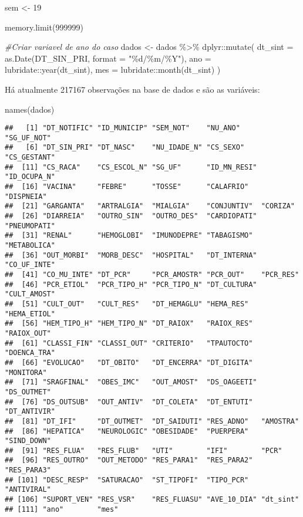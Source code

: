 \documentclass[
]{article}
\newenvironment{Shaded}{\begin{snugshade}}{\end{snugshade}}
\newcommand{\AttributeTok}[1]{\textcolor[rgb]{0.77,0.63,0.00}{#1}}
\newcommand{\CommentTok}[1]{\textcolor[rgb]{0.56,0.35,0.01}{\textit{#1}}}
\newcommand{\DecValTok}[1]{\textcolor[rgb]{0.00,0.00,0.81}{#1}}
\newcommand{\FunctionTok}[1]{\textcolor[rgb]{0.00,0.00,0.00}{#1}}
\newcommand{\NormalTok}[1]{#1}
\newcommand{\OtherTok}[1]{\textcolor[rgb]{0.56,0.35,0.01}{#1}}
\newcommand{\SpecialCharTok}[1]{\textcolor[rgb]{0.00,0.00,0.00}{#1}}
\newcommand{\StringTok}[1]{\textcolor[rgb]{0.31,0.60,0.02}{#1}}
\begin{document}
\begin{Shaded}
\begin{Highlighting}[]
\NormalTok{sem }\OtherTok{\textless{}{-}} \DecValTok{19}

\FunctionTok{memory.limit}\NormalTok{(}\DecValTok{999999}\NormalTok{)}

\CommentTok{\#Criar variavel de ano do caso}
\NormalTok{dados }\OtherTok{\textless{}{-}}\NormalTok{  dados }\SpecialCharTok{\%\textgreater{}\%}
\NormalTok{  dplyr}\SpecialCharTok{::}\FunctionTok{mutate}\NormalTok{(}
    \AttributeTok{dt\_sint =} \FunctionTok{as.Date}\NormalTok{(DT\_SIN\_PRI, }\AttributeTok{format =} \StringTok{"\%d/\%m/\%Y"}\NormalTok{),}
    \AttributeTok{ano =}\NormalTok{ lubridate}\SpecialCharTok{::}\FunctionTok{year}\NormalTok{(dt\_sint),}
    \AttributeTok{mes =}\NormalTok{ lubridate}\SpecialCharTok{::}\FunctionTok{month}\NormalTok{(dt\_sint)}
\NormalTok{  )}
\end{Highlighting}
\end{Shaded}

Há atualmente 217167 observações na base de dados e são as variáveis:

\begin{Shaded}
\begin{Highlighting}[]
\FunctionTok{names}\NormalTok{(dados)}
\end{Highlighting}
\end{Shaded}

\begin{verbatim}
##   [1] "DT_NOTIFIC" "ID_MUNICIP" "SEM_NOT"    "NU_ANO"     "SG_UF_NOT" 
##   [6] "DT_SIN_PRI" "DT_NASC"    "NU_IDADE_N" "CS_SEXO"    "CS_GESTANT"
##  [11] "CS_RACA"    "CS_ESCOL_N" "SG_UF"      "ID_MN_RESI" "ID_OCUPA_N"
##  [16] "VACINA"     "FEBRE"      "TOSSE"      "CALAFRIO"   "DISPNEIA"  
##  [21] "GARGANTA"   "ARTRALGIA"  "MIALGIA"    "CONJUNTIV"  "CORIZA"    
##  [26] "DIARREIA"   "OUTRO_SIN"  "OUTRO_DES"  "CARDIOPATI" "PNEUMOPATI"
##  [31] "RENAL"      "HEMOGLOBI"  "IMUNODEPRE" "TABAGISMO"  "METABOLICA"
##  [36] "OUT_MORBI"  "MORB_DESC"  "HOSPITAL"   "DT_INTERNA" "CO_UF_INTE"
##  [41] "CO_MU_INTE" "DT_PCR"     "PCR_AMOSTR" "PCR_OUT"    "PCR_RES"   
##  [46] "PCR_ETIOL"  "PCR_TIPO_H" "PCR_TIPO_N" "DT_CULTURA" "CULT_AMOST"
##  [51] "CULT_OUT"   "CULT_RES"   "DT_HEMAGLU" "HEMA_RES"   "HEMA_ETIOL"
##  [56] "HEM_TIPO_H" "HEM_TIPO_N" "DT_RAIOX"   "RAIOX_RES"  "RAIOX_OUT" 
##  [61] "CLASSI_FIN" "CLASSI_OUT" "CRITERIO"   "TPAUTOCTO"  "DOENCA_TRA"
##  [66] "EVOLUCAO"   "DT_OBITO"   "DT_ENCERRA" "DT_DIGITA"  "MONITORA"  
##  [71] "SRAGFINAL"  "OBES_IMC"   "OUT_AMOST"  "DS_OAGEETI" "DS_OUTMET" 
##  [76] "DS_OUTSUB"  "OUT_ANTIV"  "DT_COLETA"  "DT_ENTUTI"  "DT_ANTIVIR"
##  [81] "DT_IFI"     "DT_OUTMET"  "DT_SAIDUTI" "RES_ADNO"   "AMOSTRA"   
##  [86] "HEPATICA"   "NEUROLOGIC" "OBESIDADE"  "PUERPERA"   "SIND_DOWN" 
##  [91] "RES_FLUA"   "RES_FLUB"   "UTI"        "IFI"        "PCR"       
##  [96] "RES_OUTRO"  "OUT_METODO" "RES_PARA1"  "RES_PARA2"  "RES_PARA3" 
## [101] "DESC_RESP"  "SATURACAO"  "ST_TIPOFI"  "TIPO_PCR"   "ANTIVIRAL" 
## [106] "SUPORT_VEN" "RES_VSR"    "RES_FLUASU" "AVE_10_DIA" "dt_sint"   
## [111] "ano"        "mes"
\end{verbatim}
\end{document}
